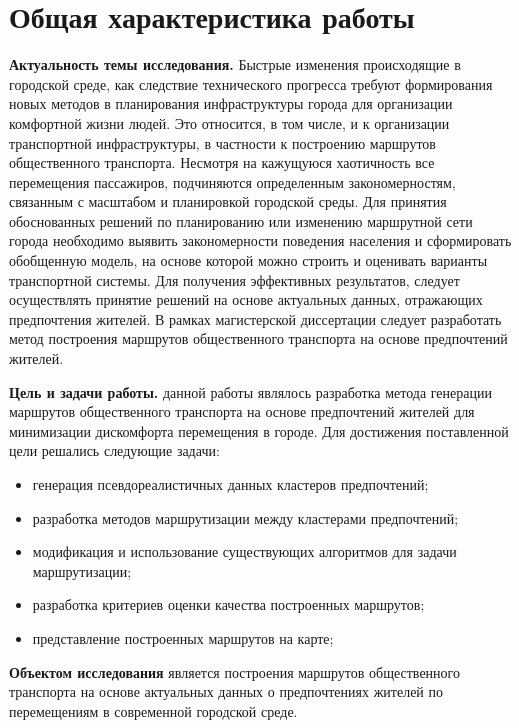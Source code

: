 \section{Общая характеристика работы}
\textbf{Актуальность темы исследования.} Быстрые изменения происходящие в городской среде, как следствие 
технического прогресса требуют формирования новых методов в планирования инфраструктуры города для 
организации комфортной жизни людей. Это относится, в том числе, и к организации транспортной 
инфраструктуры, в частности к построению маршрутов общественного транспорта. Несмотря на кажущуюся 
хаотичность все перемещения пассажиров, подчиняются определенным закономерностям, связанным с масштабом и 
планировкой городской среды. Для принятия обоснованных решений по планированию или изменению маршрутной 
сети города необходимо выявить закономерности поведения населения и сформировать обобщенную модель, на 
основе которой можно строить и оценивать варианты транспортной системы. Для получения эффективных 
результатов, следует осуществлять принятие решений на основе актуальных данных, отражающих предпочтения 
жителей. В рамках магистерской диссертации следует разработать метод построения маршрутов общественного 
транспорта на основе предпочтений жителей.


\textbf{Цель и задачи работы.} данной работы являлось разработка метода генерации маршрутов общественного 
транспорта на основе предпочтений жителей для минимизации дискомфорта перемещения в городе. Для достижения 
поставленной цели решались следующие задачи:
\begin{itemize}
    \item генерация псевдореалистичных данных кластеров предпочтений;
    \item разработка методов маршрутизации между кластерами предпочтений;
    \item модификация и использование существующих алгоритмов для задачи маршрутизации;
    \item разработка критериев оценки качества построенных маршрутов;
    \item представление построенных маршрутов на карте;
\end{itemize}

\textbf{Объектом исследования} является построения маршрутов общественного транспорта на основе актуальных 
данных о предпочтениях жителей по перемещениям в современной городской среде. 

